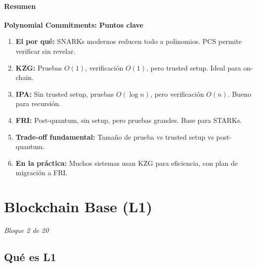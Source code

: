 \documentclass[11pt,a4paper,twoside,openright]{book}
\theoremstyle{definition}
\theoremstyle{plain}
\theoremstyle{remark}
\begin{document}
\subsubsection{Resumen}

\begin{keyidea}
\textbf{Polynomial Commitments: Puntos clave}

\begin{enumerate}
    \item \textbf{El por qué:} SNARKs modernos reducen todo a polinomios. PCS permite verificar sin revelar.
    
    \item \textbf{KZG:} Pruebas $O(1)$, verificación $O(1)$, pero trusted setup. Ideal para on-chain.
    
    \item \textbf{IPA:} Sin trusted setup, pruebas $O(\log n)$, pero verificación $O(n)$. Bueno para recursión.
    
    \item \textbf{FRI:} Post-quantum, sin setup, pero pruebas grandes. Base para STARKs.
    
    \item \textbf{Trade-off fundamental:} Tamaño de prueba vs trusted setup vs post-quantum.
    
    \item \textbf{En la práctica:} Muchos sistemas usan KZG para eficiencia, con plan de migración a FRI.
\end{enumerate}
\end{keyidea}

\cleardoublepage

\chapter{Blockchain Base (L1)}
\label{ch:bloque2}

\begin{center}
\textit{Bloque 2 de 20}
\end{center}

\section{Qué es L1}
\end{document}
